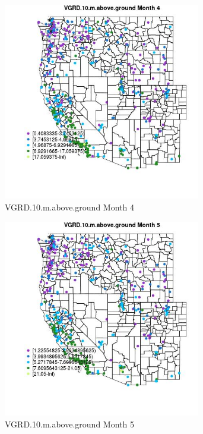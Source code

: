 \clearpage 

\begin{figure} 
\centering  
\includegraphics[width=0.77\textwidth]{Code_Outputs/ML_input_report_ML_input_PM25_Step5_part_d_de_duplicated_aves_ML_input_MapObsMo4VGRD10maboveground.jpg} 
\caption{\label{fig:ML_input_report_ML_input_PM25_Step5_part_d_de_duplicated_aves_ML_inputMapObsMo4VGRD10maboveground}VGRD.10.m.above.ground Month 4} 
\end{figure} 
 

\begin{figure} 
\centering  
\includegraphics[width=0.77\textwidth]{Code_Outputs/ML_input_report_ML_input_PM25_Step5_part_d_de_duplicated_aves_ML_input_MapObsMo5VGRD10maboveground.jpg} 
\caption{\label{fig:ML_input_report_ML_input_PM25_Step5_part_d_de_duplicated_aves_ML_inputMapObsMo5VGRD10maboveground}VGRD.10.m.above.ground Month 5} 
\end{figure} 
 

